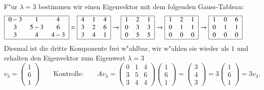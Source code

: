 F"ur $\lambda = 3$ bestimmen wir einen Eigenvektor mit dem folgenden
Gauss-Tableau:
\begin{align*}
\begin{tabular}{|>{$}c<{$}>{$}c<{$}>{$}c<{$}|}
\hline
0-3&1&4\\
3&5-3&6\\
3&4&4-3\\
\hline
\end{tabular}
&=
\begin{tabular}{|>{$}c<{$}>{$}c<{$}>{$}c<{$}|}
\hline
4&1&4\\
3&2&6\\
3&4&1\\
\hline
\end{tabular}
\rightarrow
\begin{tabular}{|>{$}c<{$}>{$}c<{$}>{$}c<{$}|}
\hline
1&2&1\\
0&3&3\\
0&5&5\\
\hline
\end{tabular}
\rightarrow
\begin{tabular}{|>{$}c<{$}>{$}c<{$}>{$}c<{$}|}
\hline
1&2&1\\
0&1&1\\
0&0&0\\
\hline
\end{tabular}
\rightarrow
\begin{tabular}{|>{$}c<{$}>{$}c<{$}>{$}c<{$}|}
\hline
1&0&6\\
0&1&1\\
0&0&0\\
\hline
\end{tabular}
\end{align*}
Diesmal ist die dritte Komponente frei w"ahlbar, wir w"ahlen sie wieder als
$1$ und erhalten den Eigenvektor zum Eigenwert $\lambda=3$
\[
v_3=\begin{pmatrix}1\\6\\1\end{pmatrix}
\qquad\text{Kontrolle:}\qquad
Av_3
=
\begin{pmatrix}
0&1&4\\
3&5&6\\
3&4&4
\end{pmatrix}
\begin{pmatrix}1\\6\\1\end{pmatrix}
=
\begin{pmatrix}3\\4\\3\end{pmatrix}
=
3\begin{pmatrix}1\\6\\1\end{pmatrix}
=
3v_3.
\]

